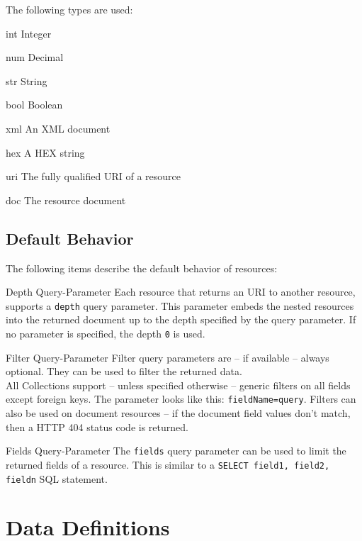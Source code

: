 \documentclass[10pt,a4paper]{scrartcl}
\begin{document}
The following types are used:

\begin{description*}
	\item[int] Integer
	\item[num] Decimal
	\item[str] String
	\item[bool] Boolean
	\item[xml] An XML document
	\item[hex] A HEX string
	\item[uri] The fully qualified URI of a resource
	\item[doc] The resource document
\end{description*}

\subsection{Default Behavior}

The following items describe the default behavior of resources:

\begin{description*}
	\item[Depth Query-Parameter] Each resource that returns an URI to another
		resource, supports a \texttt{depth} query parameter. This parameter embeds
		the nested resources into the returned document up to the depth specified by
		the query parameter. If no parameter is specified, the depth \texttt{0} is
		used.
	
	\item[Filter Query-Parameter] Filter query parameters are -- if available --
		always optional. They can be used to filter the returned data.\\
	All Collections support -- unless specified otherwise -- generic filters on
	all fields except foreign keys. The parameter looks like this:
	\texttt{fieldName=query}. Filters can also be used on document resources -- if
	the document field values don't match, then a HTTP 404 status code is
	returned.

	\item[Fields Query-Parameter] The \texttt{fields} query parameter can be used
		to limit the returned fields of a resource. This is similar to a
		\texttt{SELECT field1, field2, fieldn} SQL statement.
	
\end{description*}
 
 
\pagebreak


\section{Data Definitions}
\end{document}

